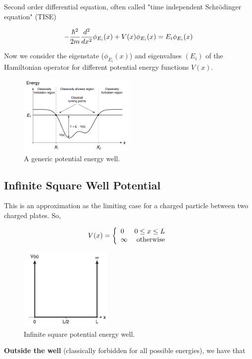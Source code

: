 \documentclass[english, 11pt]{article}
\begin{document}
\begin{itemize}
      Second order differential equation, often called "time independent Schrödinger equation" (TISE)

      \[ -\frac{\hbar^2}{2m}\frac{d^2}{dx^2}\phi_{E_i}(x) + V(x) \phi_{E_i}(x) = E_i\phi_{E_i}(x) \]

      Now we consider the eigenstate ($\phi_{E_i}(x)$) and eigenvalues $(E_i)$ of the Hamiltonian operator for different potential energy functions $V(x)$.

      \begin{figure}[t!]
            \centering
            \includegraphics[width=0.5\textwidth]{energy_quantum.png}
            \caption{A generic potential energy well.}
      \end{figure}

      \subsection{Infinite Square Well Potential}

        This is an approximation as the limiting case for a charged particle between two charged plates. So,

        \[ V(x) = \left\{ \begin{array}{lr} 0 & \mbox{$0 \leq x \leq L$} \\ \infty & \mbox{otherwise} \end{array} \right. \]

        \begin{figure}[t!]
              \centering
              \includegraphics[width=0.4\textwidth]{well.png}
              \caption{Infinite square potential energy well.}
        \end{figure}

        \textbf{Outside the well} (classically forbidden for all possible energies), we have that


\end{itemize}
\end{document}
